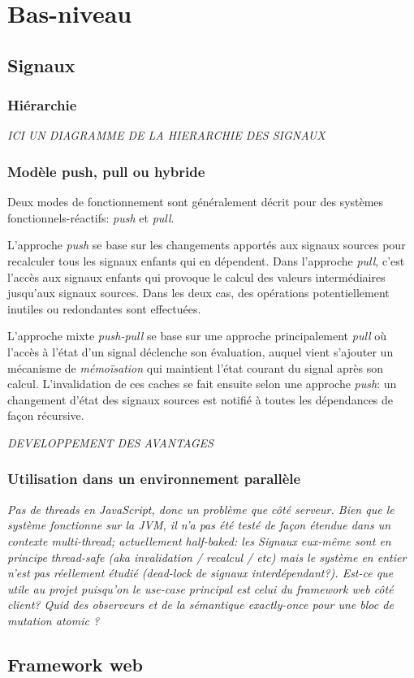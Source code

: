 \chapter{Bas-niveau}

\section{Signaux}

\subsection{Hiérarchie}
\label{sec:sig-hierarchy}

\textit{ICI UN DIAGRAMME DE LA HIERARCHIE DES SIGNAUX}

\subsection{Modèle push, pull ou hybride}

Deux modes de fonctionnement sont généralement décrit pour des systèmes fonctionnels-réactifs: \emph{push} et \emph{pull}.

L'approche \emph{push} se base sur les changements apportés aux signaux sources pour recalculer tous les signaux enfants qui en dépendent. Dans l'approche \emph{pull}, c'est l'accès aux signaux enfants qui provoque le calcul des valeurs intermédiaires jusqu'aux signaux sources. Dans les deux cas, des opérations potentiellement inutiles ou redondantes sont effectuées.

L'approche mixte \emph{push-pull} se base sur une approche principalement \emph{pull} où l'accès à l'état d'un signal déclenche son évaluation, auquel vient s'ajouter un mécanisme de \emph{mémoïsation} qui maintient l'état courant du signal après son calcul. L'invalidation de ces caches se fait ensuite selon une approche \emph{push}: un changement d'état des signaux sources est notifié à toutes les dépendances de façon récursive.

\textit{DEVELOPPEMENT DES AVANTAGES}

\subsection{Utilisation dans un environnement parallèle}

\textit{Pas de threads en JavaScript, donc un problème que côté serveur. Bien que le système fonctionne sur la JVM, il n'a pas été testé de façon étendue dans un contexte multi-thread; actuellement half-baked: les Signaux eux-même sont en principe thread-safe (aka invalidation / recalcul / etc) mais le système en entier n'est pas réellement étudié (dead-lock de signaux interdépendant?). Est-ce que utile au projet puisqu'on le use-case principal est celui du framework web côté client? Quid des observeurs et de la sémantique exactly-once pour une bloc de mutation atomic{} ?}

\section{Framework web}
